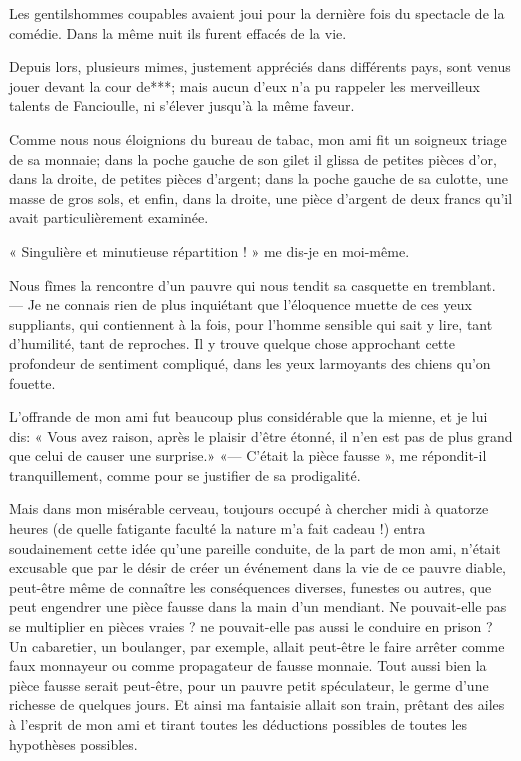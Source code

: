 Les gentilshommes coupables avaient joui pour la dernière fois du
spectacle de la comédie. Dans la même nuit ils furent effacés de la
vie.

Depuis lors, plusieurs mimes, justement appréciés dans différents pays,
sont venus jouer devant la cour de***; mais aucun
d’eux n’a pu rappeler les merveilleux
talents de Fancioulle, ni s’élever
jusqu’à la même faveur.
 

Comme nous nous éloignions du bureau de tabac, mon ami fit un soigneux
triage de sa monnaie; dans la poche gauche de son gilet il glissa de
petites pièces d’or, dans la droite, de petites pièces
d’argent; dans la poche gauche de sa culotte, une
masse de gros sols, et enfin, dans la droite, une pièce
d’argent de deux francs qu’il avait
particulièrement examinée.

« Singulière et minutieuse répartition ! » me dis{}-je en moi{}-même.

Nous fîmes la rencontre d’un pauvre qui nous tendit sa
casquette en tremblant. --- Je ne connais rien de plus inquiétant que
l’éloquence muette de ces yeux suppliants, qui
contiennent à la fois, pour l’homme sensible qui sait
y lire, tant d’humilité, tant de reproches. Il y
trouve quelque chose approchant cette profondeur de sentiment
compliqué, dans les yeux larmoyants des chiens qu’on
fouette.

L’offrande de mon ami fut beaucoup plus considérable
que la mienne, et je lui dis: « Vous avez raison, après le plaisir
d’être étonné, il n’en est pas de
plus grand que celui de causer une surprise.» «---
C’était la pièce fausse », me répondit{}-il
tranquillement, comme pour se justifier de sa prodigalité.

Mais dans mon misérable cerveau, toujours occupé à chercher midi à
quatorze heures (de quelle fatigante faculté la nature
m’a fait cadeau !) entra soudainement cette idée
qu’une pareille conduite, de la part de mon ami,
n’était excusable que par le désir de créer un
événement dans la vie de ce pauvre diable, peut{}-être même de
connaître les conséquences diverses, funestes ou autres, que peut
engendrer une pièce fausse dans la main d’un mendiant.
Ne pouvait{}-elle pas se multiplier en pièces vraies ? ne
pouvait{}-elle pas aussi le conduire en prison ? Un cabaretier, un
boulanger, par exemple, allait peut{}-être le faire arrêter comme faux
monnayeur ou comme propagateur de fausse monnaie. Tout aussi bien la
pièce fausse serait peut{}-être, pour un pauvre petit spéculateur, le
germe d’une richesse de quelques jours. Et ainsi ma
fantaisie allait son train, prêtant des ailes à
l’esprit de mon ami et tirant toutes les déductions
possibles de toutes les hypothèses possibles.

